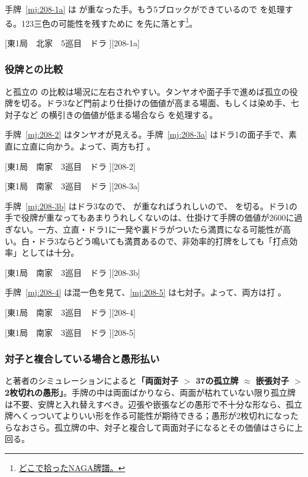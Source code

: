 \documentclass[../nankiru_main.tex]{subfiles}
\begin{document}
手牌~\ref{mj:208-1a} は  が重なった手。もう5ブロックができているので  を処理する。123三色の可能性を残すために  を先に落とす\footnote{\href{https://naga.dmv.nico/htmls/8f456393c9dc421dc9e62068fe9e07161db5c59cd25b2e5ce967b6e5627950bfv2_2.html?tw=0}{どこで拾ったNAGA牌譜。}}。

[東1局　北家　5巡目　ドラ ][208-1a]


\subsubsection*{役牌との比較}

 と孤立の  の比較は場況に左右されやすい。タンヤオや面子手で進めば孤立の役牌を切る。ドラ3など門前より仕掛けの価値が高まる場面、もしくは染め手、七対子など  の横引きの価値が低まる場合なら  を処理する\citep{yuusee-208}。

手牌~\ref{mj:208-2} はタンヤオが見える。手牌~\ref{mj:208-3a} はドラ1の面子手で、素直に立直に向かう。よって、両方も打 。

[東1局　南家　3巡目　ドラ ][208-2]

[東1局　南家　3巡目　ドラ ][208-3a]

手牌~\ref{mj:208-3b} はドラ3なので、 が重なればうれしいので、 を切る。ドラ1の手で役牌が重なってもあまりうれしくないのは、仕掛けて手牌の価値が2600に過ぎない。一方、立直・ドラ1に一発や裏ドラがついたら満貫になる可能性が高い。白・ドラ3ならどう鳴いても満貫あるので、非効率的打牌をしても「打点効率」としては十分。

[東1局　南家　3巡目　ドラ ][208-3b]

手牌~\ref{mj:208-4} は混一色を見て、\ref{mj:208-5} は七対子。よって、両方は打 。

[東1局　南家　3巡目　ドラ ][208-4]

[東1局　南家　3巡目　ドラ ][208-5]


\subsubsection{対子と複合している場合と愚形払い}

\citet{yuusee-floater} と著者のシミュレーションによると\textbf{「両面対子 $>$ 37の孤立牌 $\approx$ 嵌張対子 $>$ 2枚切れの愚形」}。手牌の中は両面ばかりなら、両面が枯れていない限り孤立牌は不要、安牌と入れ替えすべき。辺張や嵌張などの愚形で不十分な形なら、孤立牌へくっついてよりいい形を作る可能性が期待できる；愚形が2枚切れになったらなおさら。孤立牌の中、対子と複合して両面対子になるとその価値はさらに上回る。
\end{document}
